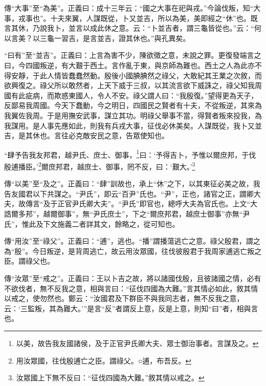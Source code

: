 {\noindent\zhuan{}\fzbyks 傳“大事”至“為美”。正義曰：成十三年云：“國之大事在祀與戎。”今論伐叛，知“大事，戎事也”。十夫來翼，人謀既從，卜又並吉，所以為美，美即經之“休”也。既言其休，乃說我卜，並言以成此休之意。云：“卜並吉者，謂三龜皆從也。”云：“何以言美？以三龜一習吉，是言並吉，證其休也。”與孔異矣。 \par}

{\noindent\shu{}\fzkt “曰有”至“並吉”。正義曰：上言為害不少，陳欲徵之意，未說之罪。更復發端言之曰，今四國叛逆，有大艱于西土。言作亂于東，與京師為難也。西土之人為此亦不得安靜，于此人情皆蠢蠢然動。殷後小國腆腆然之祿父，大敢紀其王業之次敘，而欲興復之。祿父所以敢然者，上天下威于三叔，以其流言欲下威誅之，祿父知我周國有此疵病，而欺惑東國人，令人不安。祿父謂人曰：“我殷復。”望得更為天子，反鄙易我周國。今天下蠢動，今之明日，四國民之賢者有十夫，不從叛逆，其來為我翼佐我周。于是用撫安武事，謀立其功。明祿父舉事不當，得賢者叛來投我，為我謀用。是人事先應如此，則我有兵戎大事，征伐必休美矣。人謀既從，我卜又並吉，是其休也。言往必克敵安民之意，告眾使知也。 \par}

“肆予告我友邦君，越尹氏、庶士、御事，\footnote{以美，故告我友國諸侯，及于正官尹氏卿大夫、眾士御治事者。言謀及之。}曰：‘予得吉卜，予惟以爾庶邦，于伐殷逋播臣。’\footnote{用汝眾國，往伐殷逋亡之臣。謂祿父。○逋，布吾反。}爾庶邦君，越庶士、御事，罔不反，曰：‘艱大。’\footnote{汝眾國上下無不反曰：“征伐四國為大難。”敘其情以戒之。}


{\noindent\zhuan{}\fzbyks 傳“以美”至“及之”。正義曰：“肆”訓故也，承上“休”之下，以其東征必美之故，我告友國君以下共謀之。“尹氏”，即云“百尹”氏也。“尹”，正也，諸官之正，謂卿大夫，故傳言“及于正官尹氏卿大夫”。“尹氏”即官也，總呼大夫為官氏也。上文“大誥爾多邦”，越爾御事”，無“尹氏庶士”，下之“爾庶邦君，越庶士御事”亦無“尹氏”，惟此及下文施義二者詳其文，餘略之，從可知也。 \par}

{\noindent\zhuan{}\fzbyks 傳“用汝”至“祿父”。正義曰：“逋”，逃也。“播”謂播蕩逃亡之意。祿父殷君，謂之為“殷”。今日叛逆，是背周逃亡，故云用汝眾國，往伐彼殷君于我周家逋逃亡叛之臣。謂祿父也。 \par}

{\noindent\zhuan{}\fzbyks 傳“汝眾”至“戒之”。正義曰：王以卜吉之故，將以諸國伐殷，且彼諸國之情，必有不欲伐者，無不反我之意，相與言曰：“征伐四國為大難。”言其情必如此，敘其情以戒之，使勿然也。鄭云：“汝國君及下群臣不與我同志者，無不反我之意，云：‘三監叛，其為難大。’”是言“反”者謂反上意，反是上意，則知“曰”者，相與言也。 \par}

